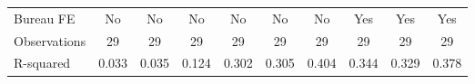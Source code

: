 {\begin{tabular}{l*{9}{c}}
Bureau FE   &          No         &          No         &          No         &          No         &          No         &          No         &         Yes         &         Yes         &         Yes         \\
Observations&          29         &          29         &          29         &          29         &          29         &          29         &          29         &          29         &          29         \\
R-squared   &       0.033         &       0.035         &       0.124         &       0.302         &       0.305         &       0.404         &       0.344         &       0.329         &       0.378         \\
\bottomrule
\end{tabular}
}
